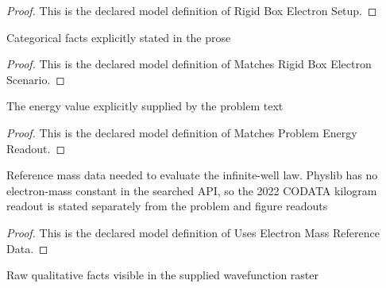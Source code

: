 \begin{proof}
  This is the declared model definition of Rigid Box Electron Setup.
\end{proof}
\begin{definition}
  \label{def:physics:phyx-mini-0508:phyxminiproblems-problemphyxmini0508-matchesrigidboxelectronscenario}
  Categorical facts explicitly stated in the prose
\end{definition}
\begin{proof}
  This is the declared model definition of Matches Rigid Box Electron Scenario.
\end{proof}
\begin{definition}
  \label{def:physics:phyx-mini-0508:phyxminiproblems-problemphyxmini0508-matchesproblemenergyreadout}
  The energy value explicitly supplied by the problem text
\end{definition}
\begin{proof}
  This is the declared model definition of Matches Problem Energy Readout.
\end{proof}
\begin{definition}
  \label{def:physics:phyx-mini-0508:phyxminiproblems-problemphyxmini0508-useselectronmassreferencedata}
  Reference mass data needed to evaluate the infinite-well law. Physlib has no electron-mass constant in the searched API, so the 2022 CODATA kilogram readout is stated separately from the problem and figure readouts
\end{definition}
\begin{proof}
  This is the declared model definition of Uses Electron Mass Reference Data.
\end{proof}
\begin{definition}
  \label{def:physics:phyx-mini-0508:phyxminiproblems-problemphyxmini0508-matchessuppliedwavefunctionfigure}
  Raw qualitative facts visible in the supplied wavefunction raster
\end{definition}
